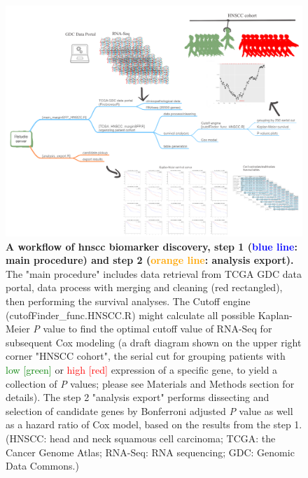\documentclass[jpm,article,submit,moreauthors,pdftex]{Definitions/mdpi}
\newcommand{\bcaption}[2]{\caption{\textbf{#1} #2}}
\begin{document}

\begin{figure}[hp]
\centering
\includegraphics[width=14cm]{Figure_1_manuscript_workflow} %
\bcaption{A workflow of \acrshort{hnscc} biomarker discovery, step 1 (\textcolor{blue}{blue line}: main procedure) and step 2 (\textcolor{orange}{orange line}: analysis export).}
{The "main procedure" includes data retrieval from TCGA GDC data portal, data process with merging and cleaning (red rectangled),%
then performing the survival analyses. The Cutoff engine (cutofFinder\_func.HNSCC.R) might calculate all possible Kaplan-Meier \textit{P} value to find the optimal cutoff value of RNA-Seq for subsequent Cox modeling (a draft diagram shown on the upper right corner "HNSCC cohort", the serial cut for grouping patients with \textcolor{green}{low [green]} or \textcolor{red}{high [red]} expression of a specific gene, to yield a collection of \textit{P} values; please see Materials and Methods section for details). The step 2 "analysis export" performs dissecting and selection of candidate genes by Bonferroni adjusted \textit{P} value as well as a hazard ratio of Cox model, based on the results from the step 1.
(HNSCC: head and neck squamous cell carcinoma; TCGA: the Cancer Genome Atlas; RNA-Seq: RNA sequencing; GDC: Genomic Data Commons.)}
\label{fig:figure1}
\end{figure}
\end{document}
